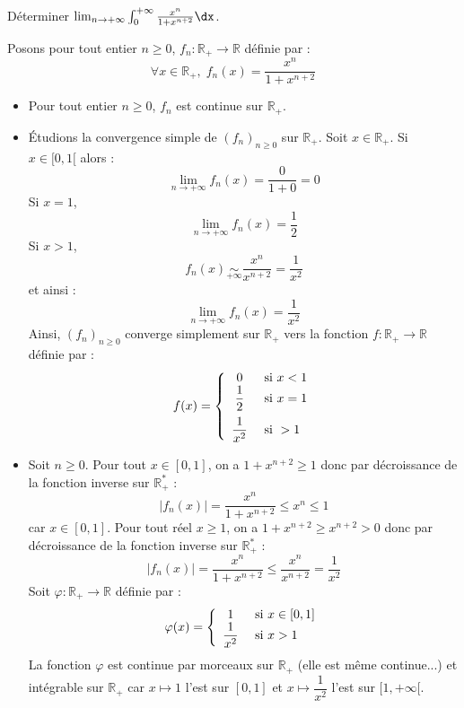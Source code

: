 \documentclass[a4paper,10pt]{report}
\begin{document}
\begin{Exercice}{} Déterminer $\lim_{n \rightarrow + \infty}\int_{0}^{ + \infty} \frac{x^{n}}{1 + x^{n + 2}} \dx$.
\end{Exercice}

\corr Posons pour tout entier $n \geq 0$, $f_n : \mathbb{R}_+ \rightarrow \mathbb{R}$ définie par :
$$ \forall x \in \mathbb{R}_+, \; f_n(x) = \frac{x^{n}}{1 + x^{n + 2}}$$
\begin{itemize}
\item Pour tout entier $n \geq 0$, $f_n$ est continue sur $\mathbb{R}_+$.
\item Étudions la convergence simple de $(f_n)_{n \geq 0}$ sur $\mathbb{R}_+$. Soit $x \in \mathbb{R}_+$. Si $x \in [0,1[$ alors :
$$ \lim_{n \rightarrow + \infty} f_n(x)= \dfrac{0}{1+0} = 0$$
Si $x=1$,
$$ \lim_{n \rightarrow + \infty} f_n(x)= \dfrac{1}{2}$$
Si $x>1$,
$$ f_n(x) \underset{+ \infty}{\sim} \dfrac{x^n}{x^{n+2}} = \dfrac{1}{x^2}$$
et ainsi :
$$ \lim_{n \rightarrow + \infty} f_n(x) = \dfrac{1}{x^2}$$
Ainsi, $(f_n)_{n \geq 0}$ converge simplement sur $\mathbb{R}_+$ vers la fonction $f : \mathbb{R}_+ \rightarrow \mathbb{R}$ définie par :
$$ f(x) = \left\lbrace \begin{array}{cl}
0 & \hbox{ si } x<1 \\
\dfrac{1}{2} & \hbox{ si } x=1 \\[0.3cm]
\dfrac{1}{x^2} & \hbox{ si } >1  
\end{array}\right.$$
\item Soit $n \geq 0$. Pour tout $x \in [0,1]$, on a $1+x^{n+2}\geq 1$ donc par décroissance de la fonction inverse sur $\mathbb{R}_+^*$ :
$$ \left\vert f_n(x) \right\vert = \dfrac{x^n}{1+x^{n+2}} \leq  x^n \leq 1$$
car $x \in [0,1]$. Pour tout réel $x\geq 1$, on a $1+x^{n+2}\geq x^{n+2}>0$ donc par décroissance de la fonction inverse sur $\mathbb{R}_+^*$ :
$$ \left\vert f_n(x) \right\vert = \dfrac{x^n}{1+x^{n+2}} \leq \dfrac{x^n}{x^{n+2}}= \dfrac{1}{x^2}$$
Soit $\varphi : \mathbb{R}_+ \rightarrow \mathbb{R}$ définie par :
$$ \varphi(x) = \left\lbrace \begin{array}{cl}
1 & \hbox{ si } x \in [0,1] \\
\dfrac{1}{x^2} & \hbox{ si } x>1 \\
\end{array}\right.$$
La fonction $\varphi$ est continue par morceaux sur $\mathbb{R}_+$ (elle est même continue...) et intégrable sur $\mathbb{R}_+$ car $x \mapsto 1$ l'est sur $[0,1]$ et $x \mapsto \dfrac{1}{x^2}$ l'est sur $[1, + \infty[$. 
\end{itemize}
\end{document}
